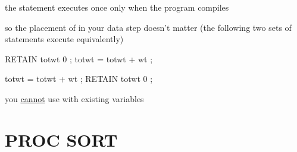 \begin{frame}[fragile]
\bi
\item the  statement executes once only when the program compiles
\item so the placement of  in your data step doesn't matter (the following two sets of statements execute equivalently)
\item[]
\begin{code}{.0}
RETAIN totwt 0 ;  
totwt = totwt + wt ;
\end{code}
\emp
{}\hspace{1in} \emp
{}
\begin{code}{.0}
totwt = totwt + wt ;
RETAIN totwt 0 ;
\end{code}
\emp
\item[]
\item {} 
\item you \underline{cannot} use  with existing variables
\ei
\end{frame}



\section[PROC SORT]{PROC SORT}
\subsection{}
\begin{frame}
\end{frame}


